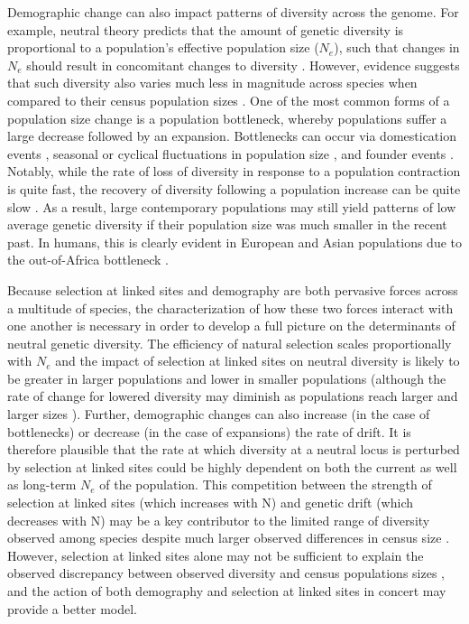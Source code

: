 \documentclass[9pt,twocolumn,twoside]{rilabRxiv}
\begin{document}
Demographic change can also impact patterns of diversity across the genome.
For example, neutral theory predicts that the amount of genetic diversity is proportional to a population’s effective population size (\textit{$N_e$}), such that changes in \textit{$N_e$} should result in concomitant changes to diversity \citep{kimura1983neutral}.
However, evidence suggests that such diversity also varies much less in magnitude across species when compared to their census population sizes \citep{lewontin1974genetic, leffler2012revisiting}.
One of the most common forms of a population size change is a population bottleneck, whereby populations suffer a large decrease followed by an expansion.
Bottlenecks can occur via domestication events \citep{doebley2006molecular, tang2010domestication, wiener2011deciphering, gaut2018demography}, seasonal or cyclical fluctuations in population size \citep{elton1924periodic, ives1970further, itoh2009seasonal, noren2014genetic}, and founder events \citep{david1988genetic, dlugosch2008founding, henn2012great}.
Notably, while the rate of loss of diversity in response to a population contraction is quite fast, the recovery of diversity following a population increase can be quite slow \citep{charlesworth2009effective}.
As a result, large contemporary populations may still yield patterns of low average genetic diversity if their population size was much smaller in the recent past.
In humans, this is clearly evident in European and Asian populations due to the out-of-Africa bottleneck \citep{10002015global}.

Because selection at linked sites and demography are both pervasive forces across a multitude of species, the characterization of how these two forces interact with one another is necessary in order to develop a full picture on the determinants of neutral genetic diversity.
The efficiency of natural selection scales proportionally with \textit{$N_e$} and the impact of selection at linked sites on neutral diversity is likely to be greater in larger populations and lower in smaller populations \citep{kaplan1989hitchhiking, cutter2013genomic, corbett2015natural} (although the rate of change for lowered diversity may diminish as populations reach larger and larger sizes \citep{gillespie2001population, santiago2016joint}).
Further, demographic changes can also increase (in the case of bottlenecks) or decrease (in the case of expansions) the rate of drift.
It is therefore plausible that the rate at which diversity at a neutral locus is perturbed by selection at linked sites could be highly dependent on both the current as well as long-term $N_e$ of the population.
This competition between the strength of selection at linked sites (which increases with N) and genetic drift (which decreases with N) may be a key contributor to the limited range of diversity observed among species  despite much larger observed differences in census size \citep{gillespie2001population, corbett2015natural, santiago2016joint}.
However, selection at linked sites alone may not be sufficient to explain the observed discrepancy between observed diversity and census populations sizes \citep{coop2016does}, and the action of both demography and selection at linked sites in concert may provide a better model.
\end{document}
